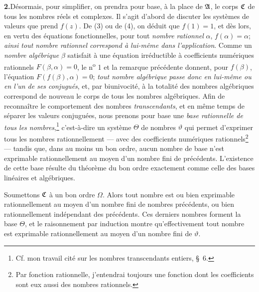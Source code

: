 \medskip
\noindent\textbf{2.}\quad Désormais, pour simplifier, on prendra pour base, à la place de $\mathfrak{A}$, le corps $\mathfrak{C}$ de tous les nombres réels et complexes. Il s'agit d'abord de discuter les systèmes de valeurs que prend $f(z)$. De (3) ou de (4), on déduit que $f(1)=1$, et dès lors, en vertu des équations fonctionnelles, pour tout \emph{nombre rationnel} $\alpha$, $f(\alpha)=\alpha$; \emph{ainsi tout nombre rationnel correspond à lui-même dans l'application}. Comme un \emph{nombre algébrique} $\beta$ satisfait à une équation irréductible à coefficients numériques rationnels $F(\beta,\alpha)=0$, le n\textsuperscript{o} 1 et la remarque précédente donnent, pour $f(\beta)$, l'équation $F(f(\beta),\alpha)=0$; \emph{tout nombre algébrique passe donc en lui-même ou en l'un de ses conjugués}, et, par biunivocité, à la totalité des nombres algébriques correspond de nouveau le corps de tous les nombres algébriques. Afin de reconnaître le comportement des nombres \emph{transcendants}, et en même temps de séparer les valeurs conjuguées, nous prenons pour base une \emph{base rationnelle de tous les nombres},\footnote{Cf. mon travail cité sur les \og{}nombres transcendants entiers\fg{}, \S\ 6.} c'est-à-dire un système $\Theta$ de nombres $\vartheta$ qui permet d'exprimer tous les nombres rationnellement --- avec des coefficients numériques rationnels\footnote{Par \og{}fonction rationnelle\fg{}, j'entendrai toujours une fonction dont les coefficients sont eux aussi des nombres rationnels.} --- tandis que, dans au moins un bon ordre, aucun nombre de base n'est exprimable rationnellement au moyen d'un nombre fini de précédents. L'existence de cette base résulte du théorème du bon ordre exactement comme celle des bases linéaires et algébriques.

Soumettons $\mathfrak{C}$ à un bon ordre $\Omega$. Alors tout nombre est ou bien exprimable rationnellement au moyen d'un nombre fini de nombres précédents, ou bien rationnellement indépendant des précédents. Ces derniers nombres forment la base $\Theta$, et le raisonnement par induction montre qu'effectivement tout nombre est exprimable rationnellement au moyen d'un nombre fini de $\vartheta$.

